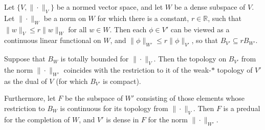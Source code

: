 \documentclass[10pt,a4paper]{amsart}
\newcommand{\bR}{{\mathbb R}}
\begin{document}
\begin{theorem}
\label{predual}
Let $\{V, \|\cdot\|_V\}$ be a normed vector space, and let $W$ be a dense 
subspace of $V$. Let $\| \cdot \|_W$ be a norm on $W $ for which there is a 
constant, $r \in \bR$, such that $\|w\|_V \leq r \|w\|_W$ for all $w \in W$.
Then each $\phi \in V'$ can be viewed as a continuous linear functional on $W$,
and $\|\phi\|_{W'} \leq r \|\phi\|_{V'}$, so that $B_{V'} \subseteq r B_{W'}$. 

Suppose that $B_W$ is totally bounded for $\|\cdot\|_V$. Then
the topology on $B_{V'}$ from the norm $\|\cdot\|_{W'}$ coincides
with the restriction to it of the weak-$*$ topology of $V'$ as the
dual of $V$ (for which $B_{V'}$ is compact). 

Furthermore, let $F$ be the subspace of $W'$ consisting
of those elements whose restriction to $B_W$ is continuous for
its topology from $\|\cdot \|_V$. Then $F$ is a predual for 
the completion of $W$, 
and $V'$ is  dense in $F$ for the norm $\|\cdot\|_{W'}$.
 \end{theorem}
\end{document}
